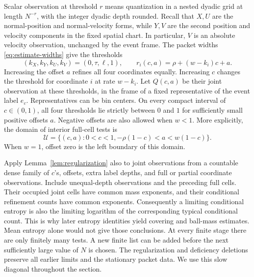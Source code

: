 Scalar observation at threshold $r$ means quantization in a nested
dyadic grid at length $N^{-r}$, with the integer dyadic depth rounded.
Recall that $X,U$ are the normal-position and normal-velocity forms,
while $Y,V$ are the second position and velocity components in the fixed
spatial chart.  In particular, $V$ is an absolute velocity observation,
unchanged by the event frame.  The packet widths
\eqref{eq:estimate-widths} give the thresholds
\begin{equation}
 (k_X,k_Y,k_U,k_V)=(0,\tau,\ell,1),\qquad
 r_i(c,a)=\rho+(w-k_i)c+a.
 \label{eq:entropy-thresholds}
\end{equation}
Increasing the offset $a$ refines all four coordinates equally. Increasing
$c$ changes the threshold for coordinate $i$ at rate $w-k_i$.
Let $Q(c,a)$ be their joint observation at these thresholds, in the frame
of a fixed representative of the event label $e_c$.  Representatives can
be bin centers.  On every compact interval of $c\in(0,1)$, all four
thresholds lie strictly between $0$ and $1$ for sufficiently small
positive offsets $a$.  Negative offsets are also allowed when $w<1$.
More explicitly, the domain of interior full-cell tests is
\begin{equation}
 \mathcal U=\{(c,a):0<c<1,
       -\rho(1-c)<a<w(1-c)\}.
 \label{eq:entropy-domain}
\end{equation}
When $w=1$, offset zero is the left boundary of this domain.

Apply Lemma~\ref{lem:regularization} also to joint observations from a
countable dense family of $c$'s, offsets, extra label depths, and full or
partial coordinate observations.  Include unequal-depth observations
and the preceding full cells.  Their occupied joint cells have common
mass exponents, and their conditional refinement counts have common
exponents.  Consequently a limiting conditional entropy is also the
limiting logarithm of the corresponding typical conditional count.
This is why later entropy identities yield covering and ball-mass
estimates.  Mean entropy alone would not give those conclusions.
At every finite stage there are only finitely many tests.  A new finite
list can be added before the next sufficiently large value of $N$ is
chosen.  The regularization and deficiency deletions preserve all earlier
limits and the stationary packet data.  We use this slow diagonal
throughout the section.

